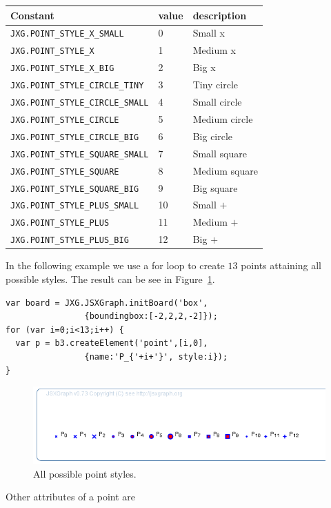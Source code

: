 \documentclass[a4paper]{tufte-book}
\begin{document}
\bigskip
\begin{center}
\footnotesize
\begin{tabular}{lll}
\toprule
Constant &    value   & description \\
\midrule
\lstinline|JXG.POINT_STYLE_X_SMALL| &     0  & Small x \\
\lstinline|JXG.POINT_STYLE_X|  & 1&   Medium x \\
\lstinline|JXG.POINT_STYLE_X_BIG|  & 2  & Big x \\
\lstinline|JXG.POINT_STYLE_CIRCLE_TINY|  &   3 &  Tiny circle \\
\lstinline|JXG.POINT_STYLE_CIRCLE_SMALL|  &  4  & Small circle \\
\lstinline|JXG.POINT_STYLE_CIRCLE| & 5 &  Medium circle \\
\lstinline|JXG.POINT_STYLE_CIRCLE_BIG| & 6  & Big circle \\
\lstinline|JXG.POINT_STYLE_SQUARE_SMALL|&   7&   Small square \\
\lstinline|JXG.POINT_STYLE_SQUARE|&  8  & Medium square \\
\lstinline|JXG.POINT_STYLE_SQUARE_BIG|&  9 &  Big square \\
\lstinline|JXG.POINT_STYLE_PLUS_SMALL|&  10 & Small $+$ \\
\lstinline|JXG.POINT_STYLE_PLUS|&   11  &Medium $+$ \\
\lstinline|JXG.POINT_STYLE_PLUS_BIG| &   12  &Big $+$ \\
\bottomrule
\end{tabular}
\end{center}
In the following example we use a for loop to create $13$ points attaining all possible styles. The result can be see in Figure~\ref{fig:4}.
\begin{lstlisting}
var board = JXG.JSXGraph.initBoard('box', 
                {boundingbox:[-2,2,2,-2]});
for (var i=0;i<13;i++) {
  var p = b3.createElement('point',[i,0], 
                {name:'P_{'+i+'}', style:i});
}
\end{lstlisting}
\begin{figure}[h]
\centerline{\includegraphics[width=0.4\linewidth]{images/b5.png}}
\caption{All possible point styles.}\label{fig:4}
\end{figure}
Other attributes of a point are
\bigskip
\end{document}
